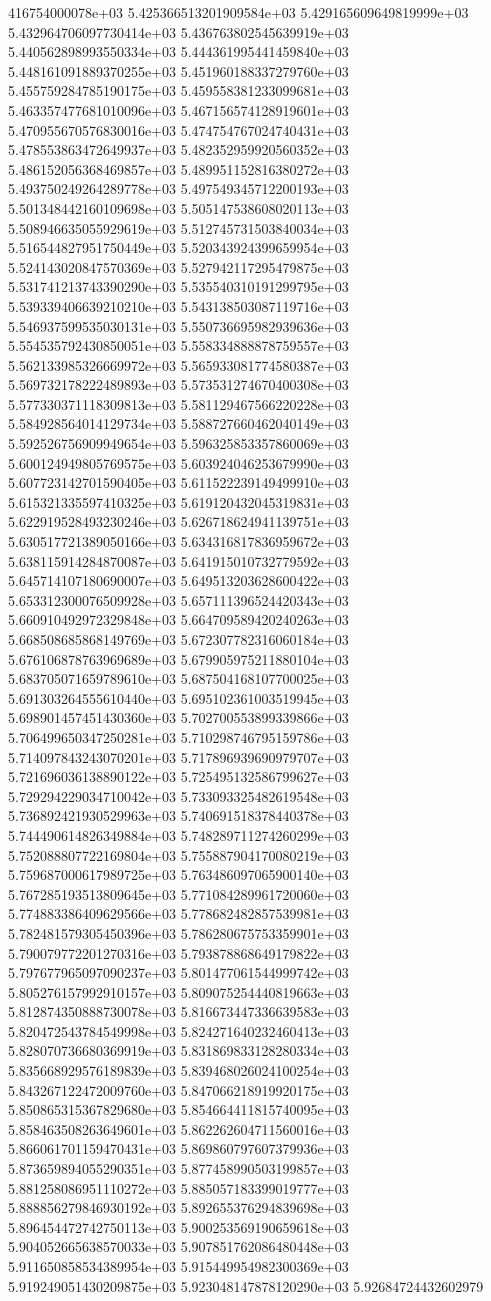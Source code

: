 416754000078e+03	5.425366513201909584e+03	5.429165609649819999e+03	5.432964706097730414e+03	5.436763802545639919e+03	5.440562898993550334e+03	5.444361995441459840e+03	5.448161091889370255e+03	5.451960188337279760e+03	5.455759284785190175e+03	5.459558381233099681e+03	5.463357477681010096e+03	5.467156574128919601e+03	5.470955670576830016e+03	5.474754767024740431e+03	5.478553863472649937e+03	5.482352959920560352e+03	5.486152056368469857e+03	5.489951152816380272e+03	5.493750249264289778e+03	5.497549345712200193e+03	5.501348442160109698e+03	5.505147538608020113e+03	5.508946635055929619e+03	5.512745731503840034e+03	5.516544827951750449e+03	5.520343924399659954e+03	5.524143020847570369e+03	5.527942117295479875e+03	5.531741213743390290e+03	5.535540310191299795e+03	5.539339406639210210e+03	5.543138503087119716e+03	5.546937599535030131e+03	5.550736695982939636e+03	5.554535792430850051e+03	5.558334888878759557e+03	5.562133985326669972e+03	5.565933081774580387e+03	5.569732178222489893e+03	5.573531274670400308e+03	5.577330371118309813e+03	5.581129467566220228e+03	5.584928564014129734e+03	5.588727660462040149e+03	5.592526756909949654e+03	5.596325853357860069e+03	5.600124949805769575e+03	5.603924046253679990e+03	5.607723142701590405e+03	5.611522239149499910e+03	5.615321335597410325e+03	5.619120432045319831e+03	5.622919528493230246e+03	5.626718624941139751e+03	5.630517721389050166e+03	5.634316817836959672e+03	5.638115914284870087e+03	5.641915010732779592e+03	5.645714107180690007e+03	5.649513203628600422e+03	5.653312300076509928e+03	5.657111396524420343e+03	5.660910492972329848e+03	5.664709589420240263e+03	5.668508685868149769e+03	5.672307782316060184e+03	5.676106878763969689e+03	5.679905975211880104e+03	5.683705071659789610e+03	5.687504168107700025e+03	5.691303264555610440e+03	5.695102361003519945e+03	5.698901457451430360e+03	5.702700553899339866e+03	5.706499650347250281e+03	5.710298746795159786e+03	5.714097843243070201e+03	5.717896939690979707e+03	5.721696036138890122e+03	5.725495132586799627e+03	5.729294229034710042e+03	5.733093325482619548e+03	5.736892421930529963e+03	5.740691518378440378e+03	5.744490614826349884e+03	5.748289711274260299e+03	5.752088807722169804e+03	5.755887904170080219e+03	5.759687000617989725e+03	5.763486097065900140e+03	5.767285193513809645e+03	5.771084289961720060e+03	5.774883386409629566e+03	5.778682482857539981e+03	5.782481579305450396e+03	5.786280675753359901e+03	5.790079772201270316e+03	5.793878868649179822e+03	5.797677965097090237e+03	5.801477061544999742e+03	5.805276157992910157e+03	5.809075254440819663e+03	5.812874350888730078e+03	5.816673447336639583e+03	5.820472543784549998e+03	5.824271640232460413e+03	5.828070736680369919e+03	5.831869833128280334e+03	5.835668929576189839e+03	5.839468026024100254e+03	5.843267122472009760e+03	5.847066218919920175e+03	5.850865315367829680e+03	5.854664411815740095e+03	5.858463508263649601e+03	5.862262604711560016e+03	5.866061701159470431e+03	5.869860797607379936e+03	5.873659894055290351e+03	5.877458990503199857e+03	5.881258086951110272e+03	5.885057183399019777e+03	5.888856279846930192e+03	5.892655376294839698e+03	5.896454472742750113e+03	5.900253569190659618e+03	5.904052665638570033e+03	5.907851762086480448e+03	5.911650858534389954e+03	5.915449954982300369e+03	5.919249051430209875e+03	5.923048147878120290e+03	5.92684724432602979